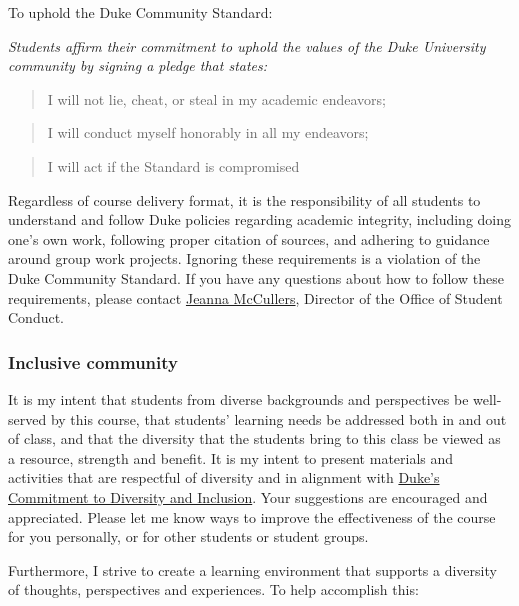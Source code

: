 \documentclass[
]{article}
\begin{document}
To uphold the Duke Community Standard:

\emph{Students affirm their commitment to uphold the values of the Duke
University community by signing a pledge that states:}

\begin{quote}
I will not lie, cheat, or steal in my academic endeavors;
\end{quote}

\begin{quote}
I will conduct myself honorably in all my endeavors;
\end{quote}

\begin{quote}
I will act if the Standard is compromised
\end{quote}

Regardless of course delivery format, it is the responsibility of all
students to understand and follow Duke policies regarding academic
integrity, including doing one's own work, following proper citation of
sources, and adhering to guidance around group work projects. Ignoring
these requirements is a violation of the Duke Community Standard. If you
have any questions about how to follow these requirements, please
contact \href{mailto:jeanna.mccullers@duke.edu}{Jeanna McCullers},
Director of the Office of Student Conduct.

\hypertarget{inclusive-community}{%
\subsubsection{Inclusive community}\label{inclusive-community}}

It is my intent that students from diverse backgrounds and perspectives
be well-served by this course, that students' learning needs be
addressed both in and out of class, and that the diversity that the
students bring to this class be viewed as a resource, strength and
benefit. It is my intent to present materials and activities that are
respectful of diversity and in alignment with
\href{https://provost.duke.edu/initiatives/commitment-to-diversity-and-inclusion}{Duke's
Commitment to Diversity and Inclusion}. Your suggestions are encouraged
and appreciated. Please let me know ways to improve the effectiveness of
the course for you personally, or for other students or student groups.

Furthermore, I strive to create a learning environment that supports a
diversity of thoughts, perspectives and experiences. To help accomplish
this:
\end{document}
